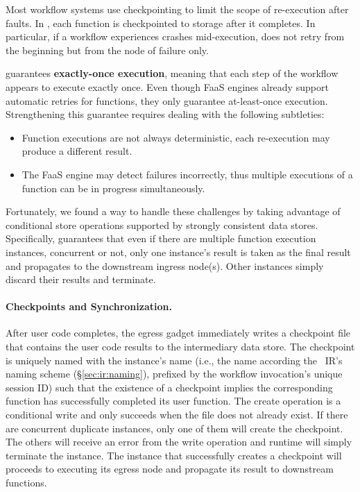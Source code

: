 Most workflow systems use checkpointing to limit the scope of re-execution after faults. 
In \name{}, each function is checkpointed to storage after it completes. In particular, if a
workflow experiences crashes mid-execution, \name{} does not retry from the beginning but
from the node of failure only.

\name{} guarantees \textbf{exactly-once execution}, meaning that each step of the 
workflow appears to execute exactly once. Even though FaaS engines already support automatic retries for functions,
they only guarantee at-least-once execution. Strengthening this guarantee requires dealing with the following subtleties:
\begin{itemize}
\item Function executions are not always deterministic, each re-execution may produce a different result.
\item The FaaS engine may detect failures incorrectly, thus multiple executions of a function can be in progress simultaneously.
\end{itemize}

Fortunately, we found a way to handle these challenges by taking advantage of conditional store operations 
supported by strongly consistent data stores. 
Specifically, \name{} guarantees that even if there are
multiple function execution instances, concurrent or not, only one instance's result is
taken as the final result and propagates to the downstream ingress node(s).
Other instances simply discard their results and terminate. 

\paragraph{Checkpoints and Synchronization.}
After user code completes, the \name{} egress gadget immediately writes a checkpoint file that contains the user code
results to the intermediary data store. The checkpoint is uniquely named with
the instance's name (i.e., the name according the
\name{}~IR's naming scheme (\S\ref{sec:ir:naming}), prefixed by the workflow
invocation's unique session ID) such that the existence of a checkpoint
implies the corresponding function has successfully completed its user
function. The create operation is a conditional write and only succeeds when
the file does not already exist. If there are concurrent duplicate instances,
only one of them will create the checkpoint. The others will receive an error
from the write operation and \name{} runtime will simply terminate the
instance. The instance that successfully creates a checkpoint will proceeds to
executing its egress node and propagate its result to downstream functions.

